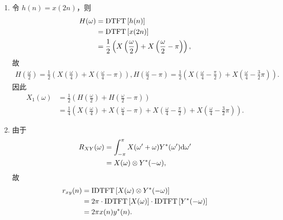\begin{solution}
    \begin{enumerate}[label=(\arabic*)]
        \item 令 $h(n) = x(2n)$，则
            \begin{align*}
                H(\omega) & = \mathrm{DTFT}\left[h(n)\right] \\
                & = \mathrm{DTFT}\left[x(2n)\right] \\
                & = \frac{1}{2}\left(X\left(\frac{\omega}{2}\right) + X\left(\frac{\omega}{2} - \pi\right)\right),
            \end{align*}
            故
            \begin{align*}
                H\left(\frac{\omega}{2}\right) = \frac{1}{2}\left(X\left(\frac{\omega}{4}\right) + X\left(\frac{\omega}{4} - \pi\right)\right),
                H\left(\frac{\omega}{2} - \pi\right) = \frac{1}{2}\left(X\left(\frac{\omega}{4} - \frac{\pi}{2}\right) + X\left(\frac{\omega}{4} - \frac{3}{2}\pi\right)\right).
            \end{align*}
            因此
            \begin{align*}
                X_1(\omega) & = \frac{1}{2}\left(H\left(\frac{\omega}{2}\right) + H\left(\frac{\omega}{2} - \pi\right)\right) \\
                & = \frac{1}{4}\left(X\left(\frac{\omega}{4}\right) + X\left(\frac{\omega}{4} - \pi\right) + X\left(\frac{\omega}{4} - \frac{\pi}{2}\right) + X\left(\frac{\omega}{4} - \frac{3}{2}\pi\right)\right).
            \end{align*}
        \item 由于
            \begin{align*}
                R_{XY}(\omega) & = \int_{-\pi}^{\pi}X(\omega' + \omega)Y^*(\omega')\mathrm{d}\omega' \\
                & = X(\omega) \otimes Y^*(-\omega),
            \end{align*}
            故
            \begin{align*}
                r_{xy}(n) & = \mathrm{IDTFT}\left[X(\omega) \otimes Y^*(-\omega)\right] \\
                & = 2\pi \cdot \mathrm{IDTFT}\left[X(\omega)\right] \cdot \mathrm{IDTFT}\left[Y^*(-\omega)\right] \\
                & = 2\pi x(n)y^*(n).
            \end{align*}
    \end{enumerate}
\end{solution}

